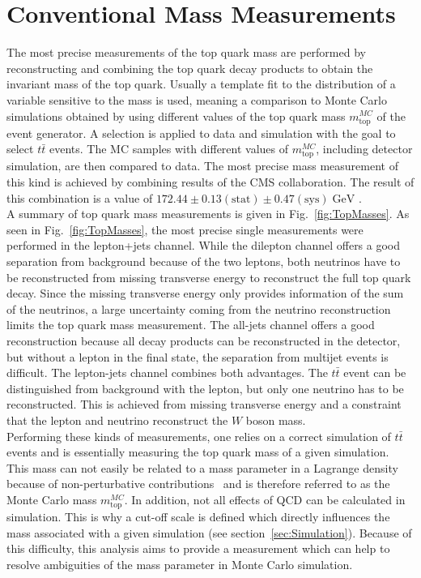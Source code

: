 \section{Conventional Mass Measurements}
	The most precise measurements of the top quark mass are performed by reconstructing and combining the top quark decay products to obtain the invariant mass of the top quark. Usually a template fit to the distribution of a variable sensitive to the mass is used, meaning a comparison to Monte Carlo simulations obtained by using different values of the top quark mass $m_\text{top}^{MC}$ of the event generator. A selection is applied to data and simulation with the goal to select $t\bar{t}$ events. The MC samples with different values of $m_\text{top}^{MC}$, including detector simulation, are then compared to data. The most precise mass measurement of this kind is achieved by combining results of the CMS collaboration. The result of this combination is a value of $172.44 \pm 0.13 (\text{stat}) \pm 0.47 (\text{sys})\;\text{GeV}$ \cite{topmass_combination}. \\
	A summary of top quark mass measurements is given in Fig.~\ref{fig:TopMasses}. As seen in Fig.~\ref{fig:TopMasses}, the most precise single measurements were performed in the lepton+jets channel. While the dilepton channel offers a good separation from background because of the two leptons, both neutrinos have to be reconstructed from missing transverse energy to reconstruct the full top quark decay. Since the missing transverse energy only provides information of the sum of the neutrinos, a large uncertainty coming from the neutrino reconstruction limits the top quark mass measurement. The all-jets channel offers a good reconstruction because all decay products can be reconstructed in the detector, but without a lepton in the final state, the separation from multijet events is difficult. The lepton-jets channel combines both advantages. The $t\bar{t}$ event can be distinguished from background with the lepton, but only one neutrino has to be reconstructed. This is achieved from missing transverse energy and a constraint that the lepton and neutrino reconstruct the $W$ boson mass.\\
	Performing these kinds of measurements, one relies on a correct simulation of $t\bar{t}$ events and is essentially measuring the top quark mass of a given simulation. This mass can not easily be related to a mass parameter in a Lagrange density because of non-perturbative contributions~\cite{tevjetmass} and is therefore referred to as the Monte Carlo mass $m_\text{top}^{MC}$. In addition, not all effects of QCD can be calculated \cite{nonperturbative} in simulation. This is why a cut-off scale \cite{cutoff} is defined which directly influences the mass associated with a given simulation (see section~\ref{sec:Simulation}). Because of this difficulty, this analysis aims to provide a measurement which can help to resolve ambiguities of the mass parameter in Monte Carlo simulation.
